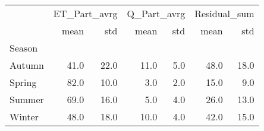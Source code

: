 \begin{tabular}{lrrrrrr}
\toprule
{} & \multicolumn{2}{l}{ET\_Part\_avrg} & \multicolumn{2}{l}{Q\_Part\_avrg} & \multicolumn{2}{l}{Residual\_sum} \\
{} &         mean &   std &        mean &  std &         mean &   std \\
Season &              &       &             &      &              &       \\
\midrule
Autumn &         41.0 &  22.0 &        11.0 &  5.0 &         48.0 &  18.0 \\
Spring &         82.0 &  10.0 &         3.0 &  2.0 &         15.0 &   9.0 \\
Summer &         69.0 &  16.0 &         5.0 &  4.0 &         26.0 &  13.0 \\
Winter &         48.0 &  18.0 &        10.0 &  4.0 &         42.0 &  15.0 \\
\bottomrule
\end{tabular}
